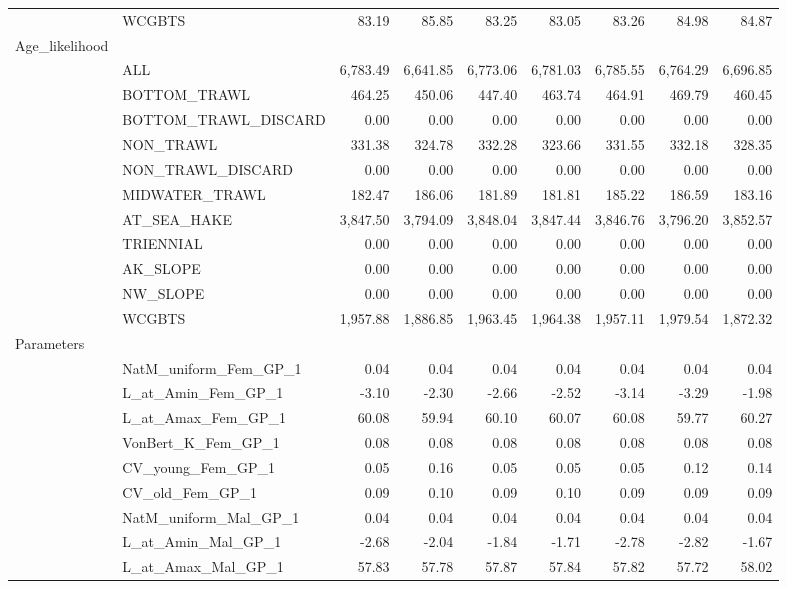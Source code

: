 \documentclass[
]{scrartcl}
\begin{document}
\begin{landscape}
\begin{longtable}{llrrrrrrr}
 & WCGBTS & 83.19 & 85.85 & 83.25 & 83.05 & 83.26 & 84.98 & 84.87 \\ 
Age\_likelihood &  &  &  &  &  &  &  &  \\ 
 & ALL & 6,783.49 & 6,641.85 & 6,773.06 & 6,781.03 & 6,785.55 & 6,764.29 & 6,696.85 \\ 
 & BOTTOM\_TRAWL & 464.25 & 450.06 & 447.40 & 463.74 & 464.91 & 469.79 & 460.45 \\ 
 & BOTTOM\_TRAWL\_DISCARD & 0.00 & 0.00 & 0.00 & 0.00 & 0.00 & 0.00 & 0.00 \\ 
 & NON\_TRAWL & 331.38 & 324.78 & 332.28 & 323.66 & 331.55 & 332.18 & 328.35 \\ 
 & NON\_TRAWL\_DISCARD & 0.00 & 0.00 & 0.00 & 0.00 & 0.00 & 0.00 & 0.00 \\ 
 & MIDWATER\_TRAWL & 182.47 & 186.06 & 181.89 & 181.81 & 185.22 & 186.59 & 183.16 \\ 
 & AT\_SEA\_HAKE & 3,847.50 & 3,794.09 & 3,848.04 & 3,847.44 & 3,846.76 & 3,796.20 & 3,852.57 \\ 
 & TRIENNIAL & 0.00 & 0.00 & 0.00 & 0.00 & 0.00 & 0.00 & 0.00 \\ 
 & AK\_SLOPE & 0.00 & 0.00 & 0.00 & 0.00 & 0.00 & 0.00 & 0.00 \\ 
 & NW\_SLOPE & 0.00 & 0.00 & 0.00 & 0.00 & 0.00 & 0.00 & 0.00 \\ 
 & WCGBTS & 1,957.88 & 1,886.85 & 1,963.45 & 1,964.38 & 1,957.11 & 1,979.54 & 1,872.32 \\ 
Parameters &  &  &  &  &  &  &  &  \\ 
 & NatM\_uniform\_Fem\_GP\_1 & 0.04 & 0.04 & 0.04 & 0.04 & 0.04 & 0.04 & 0.04 \\ 
 & L\_at\_Amin\_Fem\_GP\_1 & -3.10 & -2.30 & -2.66 & -2.52 & -3.14 & -3.29 & -1.98 \\ 
 & L\_at\_Amax\_Fem\_GP\_1 & 60.08 & 59.94 & 60.10 & 60.07 & 60.08 & 59.77 & 60.27 \\ 
 & VonBert\_K\_Fem\_GP\_1 & 0.08 & 0.08 & 0.08 & 0.08 & 0.08 & 0.08 & 0.08 \\ 
 & CV\_young\_Fem\_GP\_1 & 0.05 & 0.16 & 0.05 & 0.05 & 0.05 & 0.12 & 0.14 \\ 
 & CV\_old\_Fem\_GP\_1 & 0.09 & 0.10 & 0.09 & 0.10 & 0.09 & 0.09 & 0.09 \\ 
 & NatM\_uniform\_Mal\_GP\_1 & 0.04 & 0.04 & 0.04 & 0.04 & 0.04 & 0.04 & 0.04 \\ 
 & L\_at\_Amin\_Mal\_GP\_1 & -2.68 & -2.04 & -1.84 & -1.71 & -2.78 & -2.82 & -1.67 \\ 
 & L\_at\_Amax\_Mal\_GP\_1 & 57.83 & 57.78 & 57.87 & 57.84 & 57.82 & 57.72 & 58.02 \\ 

\end{longtable}
\end{landscape}
\end{document}
